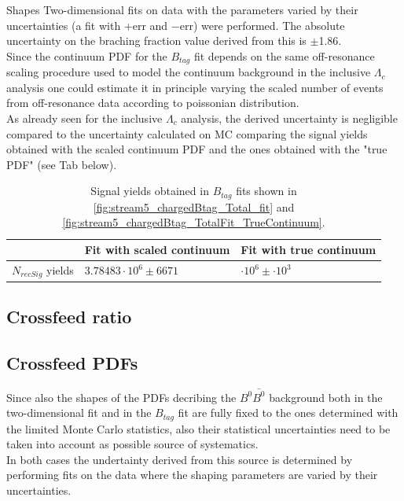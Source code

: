  Shapes
  Two-dimensional fits on data with the parameters varied by their uncertainties (a fit with +err and −err) were performed.
  The absolute uncertainty on the braching fraction value derived from this is $\pm$1.86.\\

\noindent  Since the continuum PDF for the $B_{tag}$ fit depends on the same off-resonance scaling procedure used to model 
the continuum background in the  inclusive $\Lambda_c$ analysis one could estimate it in principle varying the scaled number of events
from off-resonance data according to poissonian distribution.\\
As already seen for the inclusive $\Lambda_c$ analysis, the derived uncertainty is negligible compared to the uncertainty calculated 
on MC comparing the signal yields obtained with the scaled continuum PDF and the ones obtained with the "true PDF" (see Tab below).

\begin{table}[H]
  \begin{tabular}{ |p{2.5cm}||p{5cm}| p{4.5cm}| }
  \hline
      \    &  Fit with scaled continuum &  Fit with true continuum\\
   \hline
   $N_{recSig}$  yields     &  $3.78483  \cdot 10^6 \pm 6671 $   & $   \cdot 10^6 \pm  \cdot 10^3$\\
 
   \hline
  \end{tabular}
  \caption{Signal yields obtained in $B_{tag}$ fits shown in \cref{fig:stream5_chargedBtag_Total_fit} and \cref{fig:stream5_chargedBtag_TotalFit_TrueContinuum}.}
  \end{table}
  \vspace{0.2 cm}




 \subsection{Crossfeed ratio}

\subsection{Crossfeed PDFs}

Since also the shapes of the PDFs decribing the $B^0 \bar{B^0}$ background both in the two-dimensional fit and in the $B_{tag}$ fit
 are fully fixed to the ones determined with the limited Monte Carlo statistics, also their statistical uncertainties
need to be taken into account as possible source of systematics.\\
In both cases the undertainty derived from this source is determined by performing fits on the data where the shaping parameters are varied 
by their uncertainties.

